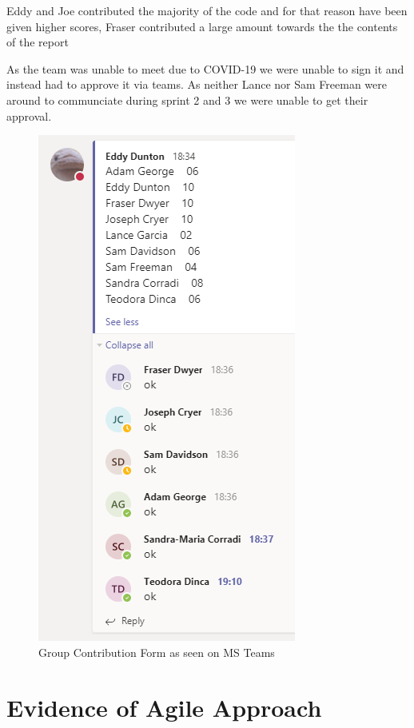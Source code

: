\documentclass[11pt]{report}
\begin{document}
Eddy and Joe contributed the majority of the code and for that reason have been given higher scores, Fraser contributed a large amount towards the the contents of the report

As the team was unable to meet due to COVID-19 we were unable to sign it and instead had to approve it via teams. As neither Lance nor Sam Freeman were around to communciate during sprint 2 and 3 we were unable to get their approval.

\newpage

\begin{figure}[!h]
	\includegraphics{gcf.png}
	\caption{Group Contribution Form as seen on MS Teams}
	\label{fig:gcf}
\end{figure}

\newpage

\section{Evidence of Agile Approach}
\label{sec:agileapp}
\end{document}
